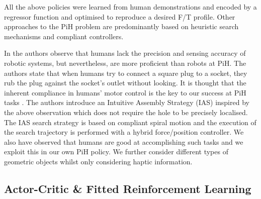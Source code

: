 \documentclass[final,3p,times,twocolumn]{elsarticle}
\begin{document}



All the above policies were learned from human demonstrations and encoded by a regressor function and
optimised to reproduce a desired F/T profile. Other approaches to the PiH problem 
are predominantly based on heuristic search mechanisms and compliant controllers.



In \cite{intuitive_peg_isr_2013} the authors observe that humans lack the precision and sensing 
accuracy of robotic systems, but nevertheless, are more proficient than robots at PiH. The authors state that when 
humans try to connect a square plug to a socket, they rub the plug against the socket's 
outlet without looking. It is thought that the inherent compliance in humans' motor control  
is the key to our success at PiH tasks \cite{compliant_manip_icra_2008}. 
The authors introduce an Intuitive Assembly Strategy (IAS) inspired by the above observation which 
does not require the hole to be precisely localised. The IAS search strategy is based on compliant 
spiral motion and the execution of the search trajectory is performed with a hybrid force/position controller.
We also have observed that humans are good at accomplishing such tasks and we exploit this in our own PiH policy. 
We further consider different types of geometric objects whilst only considering haptic information.



\subsection{Actor-Critic \& Fitted Reinforcement Learning}
\end{document}
